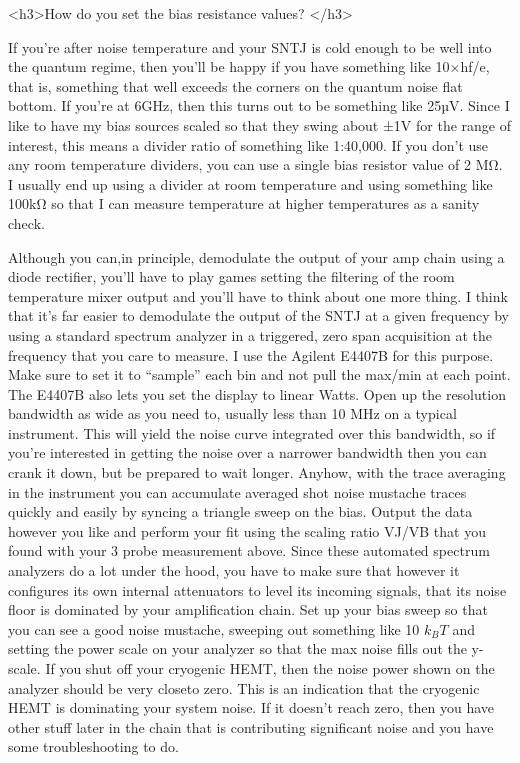 \documentclass[11pt]{article}
\begin{document}
<h3>How do you set the bias resistance values? </h3>



If you’re after noise temperature and your SNTJ is cold enough to be well into the quantum regime, then you’ll be happy if you have something like 10×hf/e, that is, something that well exceeds the corners on the quantum noise ﬂat bottom. If you’re at 6GHz, then this turns out to be something like 25µV. Since I like to have my bias sources scaled so that they swing about ±1V for the range of interest, this means a divider ratio of something like 1:40,000. If you don’t use any room temperature dividers, you can use a single bias resistor value of 2 MΩ. I usually end up using a divider at room temperature and using something like 100kΩ so that I can measure temperature at higher temperatures as a sanity check.





Although you can,in principle, demodulate the output of your amp chain using a diode rectifier, you’ll have to play games setting the ﬁltering of the room temperature mixer output and you’ll have to think about one more thing. I think that it’s far easier to demodulate the output of the SNTJ at a given frequency by using a standard spectrum analyzer in a triggered, zero span acquisition at the frequency that you care to measure. I use the Agilent E4407B for this purpose. Make sure to set it to “sample” each bin and not pull the max/min at each point. The E4407B also lets you set the display to linear Watts. Open up the resolution bandwidth as wide as you need to, usually less than 10 MHz on a typical instrument. This will yield the noise curve integrated over this bandwidth, so if you’re interested in getting the noise over a narrower bandwidth then you can crank it down, but be prepared to wait longer. Anyhow, with the trace averaging in the instrument you can accumulate averaged shot noise mustache traces quickly and easily by syncing a triangle sweep on the bias. Output the data however you like and perform your ﬁt using the scaling ratio VJ/VB that you found with your 3 probe measurement above. Since these automated spectrum analyzers do a lot under the hood, you have to make sure that however it conﬁgures its own internal attenuators to level its incoming signals, that its noise ﬂoor is dominated by your amplification chain. Set up your bias sweep so that you can see a good noise mustache, sweeping out something like 10 $k_BT$  and setting the power scale on your analyzer so that the max noise fills out the y-scale. If you shut off your cryogenic HEMT, then the noise power shown on the analyzer should be very closeto zero. This is an indication that the cryogenic HEMT is dominating your system noise. If it doesn’t reach zero, then you have other stuff later in the chain that is contributing significant noise and you have some troubleshooting to do.
\end{document}
